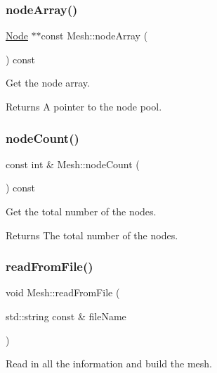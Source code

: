 \subsubsection{\texorpdfstring{node\+Array()}{nodeArray()}}
{\footnotesize\ttfamily \mbox{\hyperlink{class_node}{Node}} $\ast$$\ast$const Mesh\+::node\+Array (\begin{DoxyParamCaption}{ }\end{DoxyParamCaption}) const}



Get the node array. 

\begin{DoxyReturn}{Returns}
A pointer to the node pool. 
\end{DoxyReturn}
\mbox{\label{class_mesh_a6a535f67f00ed39f945aaa1e8039a277}} 
\subsubsection{\texorpdfstring{node\+Count()}{nodeCount()}}
{\footnotesize\ttfamily const int \& Mesh\+::node\+Count (\begin{DoxyParamCaption}{ }\end{DoxyParamCaption}) const}



Get the total number of the nodes. 

\begin{DoxyReturn}{Returns}
The total number of the nodes. 
\end{DoxyReturn}
\mbox{\label{class_mesh_a519813e103dbb3fb1739a2c40b3e1153}} 
\subsubsection{\texorpdfstring{read\+From\+File()}{readFromFile()}}
{\footnotesize\ttfamily void Mesh\+::read\+From\+File (\begin{DoxyParamCaption}\item[{std\+::string const \&}]{file\+Name }\end{DoxyParamCaption})}



Read in all the information and build the mesh. 


